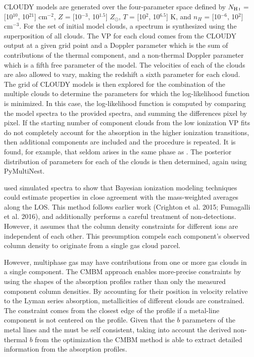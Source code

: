 \documentclass[fleqn,usenatbib]{mnras}
\begin{document}
CLOUDY models are generated over the four-parameter space defined by $N_{\ion{H}{I}}$ = [10$^{10}$, 10$^{21}$] cm$^{-2}$, $Z$ = [10$^{-3}$, 10$^{1.5}$] $Z_\odot$, $T$ = [10$^{2}$, 10$^{6.5}$] K, and $n_H$ = [10$^{-6}$, 10$^{2}$] cm$^{-3}$.
For the set of initial model clouds, a spectrum is synthesized using the superposition of all clouds.
The VP for each cloud comes from the CLOUDY output at a given grid point and a Doppler parameter which is the sum of contributions of the thermal component, and a non-thermal Doppler parameter which is a fifth free parameter of the model.
The velocities of each of the clouds are also allowed to vary, making the redshift a sixth parameter for each cloud.
The grid of CLOUDY models is then explored for the combination of the multiple clouds to determine the parameters for which the log-likelihood function is minimized.
In this case, the log-likelihood function is computed by comparing the model spectra to the provided spectra, and summing the differences pixel by pixel.
If the starting number of component clouds from the low ionization VP fits do not completely account for the absorption in the higher ionization transitions, then additional components are included and the procedure is repeated.
It is found, for example, that  seldom arises in the same phase as .
The posterior distribution of parameters for each of the clouds is then determined, again using PyMultiNest.

\cite{liang2018Observing} used simulated spectra to show that Bayesian ionization modeling techniques could estimate properties in close agreement with the  mass-weighted averages along the LOS.
This method follows earlier work (Crighton et al. 2015; Fumagalli et al. 2016), and additionally performs a careful treatment of non-detections.
However, it assumes that the column density constraints for different ions are independent of each other.
This presumption compels each component's observed column density to originate from a single gas cloud parcel.

However, multiphase gas may have contributions from one or more gas clouds in a single component.
The CMBM approach enables more-precise constraints by using the shapes of the absorption profiles rather than only the measured component column densities.
By accounting for their position in velocity relative to the Lyman series absorption, metallicities of different clouds are constrained.
The constraint comes from the closest edge of the  profile if a metal-line component is not centered on the  profile.
Given that the $b$ parameters of the metal lines and the  must be self consistent, taking into account the derived non-thermal $b$ from the optimization the CMBM method is able to extract detailed information from the absorption profiles.
\end{document}
